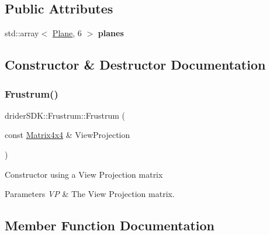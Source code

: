 \subsection*{Public Attributes}
\begin{DoxyCompactItemize}
\item 
\mbox{\label{classdrider_s_d_k_1_1_frustrum_a91edbb60fc8a536d9f62ac4b340a262c}} 
std\+::array$<$ \hyperlink{classdrider_s_d_k_1_1_plane}{Plane}, 6 $>$ {\bfseries planes}
\end{DoxyCompactItemize}


\subsection{Constructor \& Destructor Documentation}
\mbox{\label{classdrider_s_d_k_1_1_frustrum_a4a79e8234bbf25c8cf850f01a6485a1a}} 
\subsubsection{\texorpdfstring{Frustrum()}{Frustrum()}}
{\footnotesize\ttfamily drider\+S\+D\+K\+::\+Frustrum\+::\+Frustrum (\begin{DoxyParamCaption}\item[{const \hyperlink{classdrider_s_d_k_1_1_matrix4x4}{Matrix4x4} \&}]{View\+Projection }\end{DoxyParamCaption})}

Constructor using a View Projection matrix


\begin{DoxyParams}{Parameters}
{\em VP} & The View Projection matrix. \\
\hline
\end{DoxyParams}


\subsection{Member Function Documentation}
\mbox{\label{classdrider_s_d_k_1_1_frustrum_a9ea85ba52dce08ebf3d18a5241d2d387}} 

